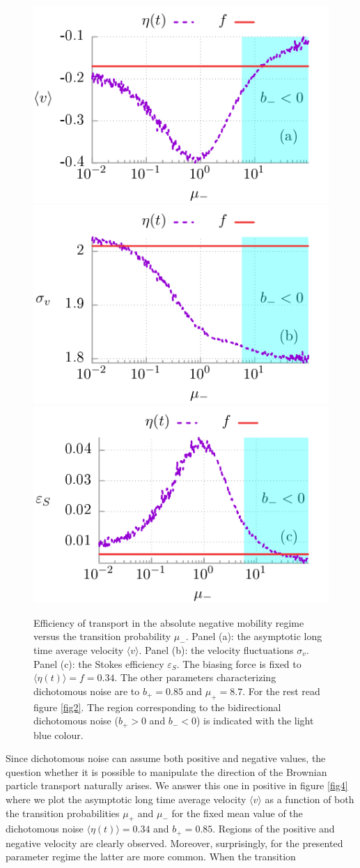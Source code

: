 \documentclass[12pt]{iopart}
\begin{document}
\begin{figure}[t]
	\centering
	\includegraphics[width=0.45\linewidth]{fig5a.pdf}
	\includegraphics[width=0.45\linewidth]{fig5b.pdf}\\
	\includegraphics[width=0.45\linewidth]{fig5c.pdf}
	\caption{Efficiency of transport in the absolute negative mobility regime versus the transition probability $\mu_-$. Panel (a): the asymptotic long time average velocity $\langle v \rangle$. Panel (b): the velocity fluctuations $\sigma_v$. Panel (c): the Stokes efficiency $\varepsilon_S$. The biasing force is fixed to $\langle \eta(t) \rangle = f = 0.34$. The other parameters characterizing dichotomous noise are to $b_+ = 0.85$ and $\mu_+ = 8.7$. For the rest read figure \ref{fig2}. The region corresponding to the bidirectional dichotomous noise ($b_+ > 0$ and $b_- < 0$) is indicated with the light blue colour.}
	\label{fig5}
\end{figure}
Since dichotomous noise can assume both positive and negative values, the question whether it is possible to manipulate the direction of the Brownian particle transport naturally arises. We answer this one in positive in figure \ref{fig4} where we plot the asymptotic long time average velocity $\langle v \rangle$ as a function of both the transition probabilities 
$\mu_+$ and $\mu_-$ for the fixed mean value of the dichotomous noise $\langle \eta(t) \rangle = 0.34$ and $b_+ = 0.85$. Regions of the positive and negative velocity are clearly observed. Moreover, surprisingly, for the presented parameter regime the latter are more common. When the transition 
\end{document}
